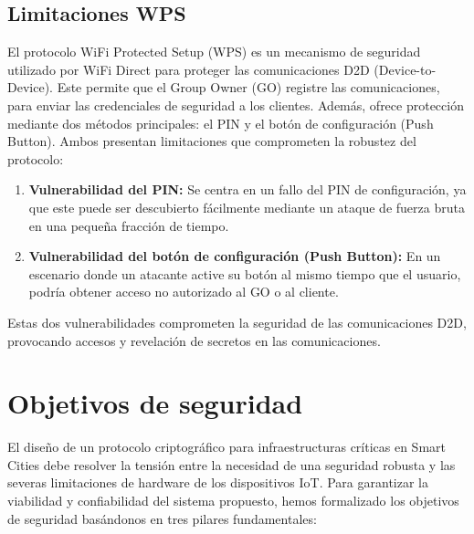 \documentclass[conference,a4paper,onecolumn,11pt]{IEEEtran} %
\begin{document}
\subsection{Limitaciones WPS}
El protocolo WiFi Protected Setup (WPS) es un mecanismo de seguridad utilizado por WiFi Direct para proteger las comunicaciones D2D (Device-to-Device). Este permite que el Group Owner (GO) registre las comunicaciones, para enviar las credenciales de seguridad a los clientes. Además, ofrece protección mediante dos métodos principales: el PIN y el botón de configuración (Push Button). Ambos presentan limitaciones que comprometen la robustez del protocolo:
\begin{enumerate}
    \item \textbf{Vulnerabilidad del PIN:} Se centra en un fallo del PIN de configuración, ya que este puede ser descubierto fácilmente mediante un ataque de fuerza bruta en una pequeña fracción de tiempo.\cite{viehbock2011wps} 
    \item \textbf{Vulnerabilidad del botón de configuración (Push Button):} En un escenario donde un atacante active su botón al mismo tiempo que el usuario, podría obtener acceso no autorizado al GO o al cliente.\cite{viehbock2011wps}
\end{enumerate}

Estas dos vulnerabilidades comprometen la seguridad de las comunicaciones D2D, provocando accesos y revelación de secretos en las comunicaciones.

\section{Objetivos de seguridad}

El diseño de un protocolo criptográfico para infraestructuras críticas en Smart Cities debe resolver la tensión entre la necesidad de una seguridad robusta y las severas limitaciones de hardware de los dispositivos IoT. Para garantizar la viabilidad y confiabilidad del sistema propuesto, hemos formalizado los objetivos de seguridad basándonos en tres pilares fundamentales:\cite{gaba2021secure, wang2017survey}
\end{document}

